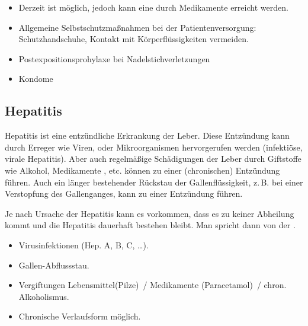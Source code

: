 {%
\begin{itemize}
  \item Derzeit ist  möglich, jedoch
  kann eine  durch
  Medikamente erreicht werden.
\end{itemize}
}
{
}
{}
{}
{}

{%
\begin{itemize}
  \item Allgemeine Selbstschutzmaßnahmen bei der
  Patientenversorgung: Schutzhandschuhe, Kontakt mit
  Körperflüssigkeiten vermeiden.
  \item Postexpositionsprohylaxe bei Nadelstichverletzungen
  \item Kondome
\end{itemize}
}
{
}
{}
{}
{}




\subsection{Hepatitis}
\label{topic:hepatitis-virale}%
\label{topic:hepatitis-toxisch}%
\label{topic:hepatitis}%
%
%




{%
Hepatitis ist eine
entzündliche Erkrankung der Leber. Diese Entzündung kann durch Erreger wie
Viren, oder Mikroorganismen hervorgerufen werden
(infektiöse, virale Hepatitis). Aber auch
regelmäßige Schädigungen der Leber durch Giftstoffe wie
Alkohol, Medikamente , etc. können
zu einer (chronischen) Entzündung führen. Auch ein länger
bestehender Rückstau der Gallenflüssigkeit, z.\,B. bei einer
Verstopfung des Gallenganges, kann zu einer Entzündung
führen.

Je nach Ursache der Hepatitis kann es vorkommen, dass es zu
keiner Abheilung kommt und die Hepatitis dauerhaft bestehen
bleibt. Man spricht dann von der .} 
{
\begin{itemize}
  \item Virusinfektionen (Hep. A, B, C, \ldots ).
  \item Gallen-Abflussstau.
  \item Vergiftungen Lebensmittel(Pilze)~/
  Medikamente (Paracetamol)~/ chron. Alkoholismus.
  \item Chronische Verlaufsform möglich.
\end{itemize}
}{}{}{}

